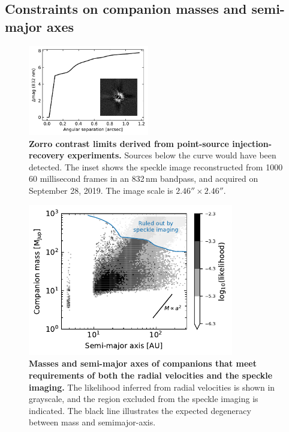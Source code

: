 \documentclass[12pt,twocolumn,tighten]{aastex62}
\begin{document}
\subsection{Constraints on companion masses and semi-major axes}

\begin{figure}[!t]
	\begin{center}
		\leavevmode
		\includegraphics[width=0.47\textwidth]{f3.pdf}
	\end{center}
	\vspace{-0.7cm}
    \caption{
      {\bf Zorro contrast limits derived from point-source
      injection-recovery experiments.} Sources below the curve would
      have been detected.  The inset shows the speckle image
      reconstructed from 1000 60 millisecond frames in an 832$\,$nm
      bandpass, and acquired on September 28, 2019.  The image scale
      is $2.46''\times2.46''$.
    }
    \label{fig:zorro}
\end{figure}

\begin{figure}[t]
	\begin{center}
		\leavevmode
		\includegraphics[width=0.8\textwidth]{f4.pdf}
	\end{center}
	\vspace{-0.8cm}
	\caption{
    {\bf Masses and semi-major axes of companions that meet
    requirements of both the radial velocities and the speckle
    imaging.} The likelihood inferred from radial velocities is shown
    in grayscale, and the region excluded from the speckle imaging is
    indicated.  The black line illustrates the expected degeneracy between mass and semimajor-axis.
	\label{fig:mass_sma}
  \vspace{-0cm}
	}
\end{figure}
\end{document}
